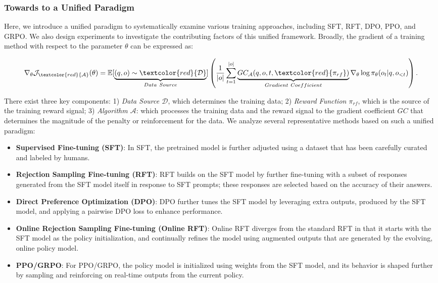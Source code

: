 \begin{itemize}[topsep=0pt]
\subsubsection{Towards to a Unified Paradigm} Here, we introduce a unified paradigm to systematically examine various training approaches, including SFT, RFT, DPO, PPO, and GRPO. We also design experiments to investigate the contributing factors of this unified framework. Broadly, the gradient of a training method with respect to the parameter $\theta$ can be expressed as:

\begin{equation}
    \nabla_{\theta}\mathcal{J}_{\textcolor{red}{\mathcal{A}}}(\theta) = \mathbb{E}[\underbrace{(q,o) \sim \textcolor{red}{\mathcal{D}}}_{Data \ Source}]\left( \frac{1}{|o|} \sum_{t=1}^{|o|}  \underbrace{GC_{{\mathcal{A}}}(q, o, t, \textcolor{red}{\pi_{{rf}}})}_{Gradient \ Coefficient}  \nabla_{\theta}\log \pi_{\theta}(o_t | q, o_{<t})\right).
\label{eq:objective}
\end{equation}

There exist three key components: 1) \textit{Data Source $\mathcal{D}$}, which determines the training data; 2) \textit{Reward Function $\pi_{{rf}}$}, which is the source of the training reward signal; 3) \textit{Algorithm $\mathcal{A}$}: which processes the training data and the reward signal to the gradient coefficient $GC$ that determines the magnitude of the penalty or reinforcement for the data. We analyze several representative methods based on such a unified paradigm:

\begin{itemize}
    \item \textbf{Supervised Fine-tuning (SFT)}: In SFT, the pretrained model is further adjusted using a dataset that has been carefully curated and labeled by humans.
    \item \textbf{Rejection Sampling Fine-tuning (RFT)}: RFT builds on the SFT model by further fine-tuning with a subset of responses generated from the SFT model itself in response to SFT prompts; these responses are selected based on the accuracy of their answers.
    \item \textbf{Direct Preference Optimization (DPO)}: DPO further tunes the SFT model by leveraging extra outputs, produced by the SFT model, and applying a pairwise DPO loss to enhance performance.
    \item \textbf{Online Rejection Sampling Fine-tuning (Online RFT)}: Online RFT diverges from the standard RFT in that it starts with the SFT model as the policy initialization, and continually refines the model using augmented outputs that are generated by the evolving, online policy model.
    \item \textbf{PPO/GRPO}: For PPO/GRPO, the policy model is initialized using weights from the SFT model, and its behavior is shaped further by sampling and reinforcing on real-time outputs from the current policy.
\end{itemize}


\end{itemize}
